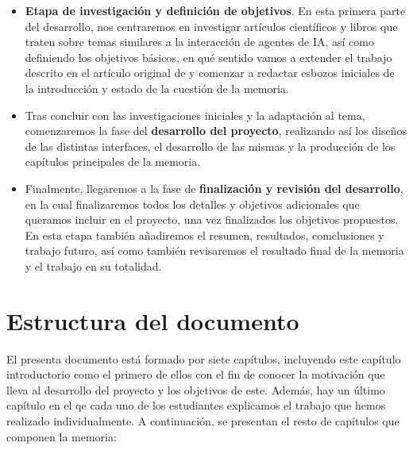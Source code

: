 \begin{itemize}
	
	\item \textbf{Etapa de investigación y definición de objetivos}. En esta primera parte del desarrollo, nos centraremos en investigar artículos científicos y libros que traten sobre temas similares a la interacción de agentes de IA, así como definiendo los objetivos básicos, en qué sentido vamos a extender el trabajo descrito en el artículo original de \ga y comenzar a redactar esbozos iniciales de la introducción y estado de la cuestión de la memoria.
	
	\item Tras concluir con las investigaciones iniciales y la adaptación al tema, comenzaremos la fase del \textbf{desarrollo del proyecto}, realizando así los diseños de las distintas interfaces, el desarrollo de las mismas y la producción de los capítulos principales de la memoria.
	
	\item Finalmente, llegaremos a la fase de \textbf{finalización y revisión del desarrollo}, en la cual finalizaremos todos los detalles y objetivos adicionales que queramos incluir en el proyecto, una vez finalizados los objetivos propuestos. En esta etapa también añadiremos el resumen, resultados, comclusiones y trabajo futuro, así como también revisaremos el resultado final de la memoria y el trabajo en su totalidad.
\end{itemize}



\section{Estructura del documento}
El presenta documento está formado por siete capítulos, incluyendo este capítulo introductorio como el primero de ellos con el fin de conocer la motivación que lleva al desarrollo del proyecto y los objetivos de este. Además, hay un último capítulo en el qe cada uno de los estudiantes explicamos el trabajo que hemos realizado individualmente. A continuación, se presentan el resto de capítulos que componen la memoria: 

